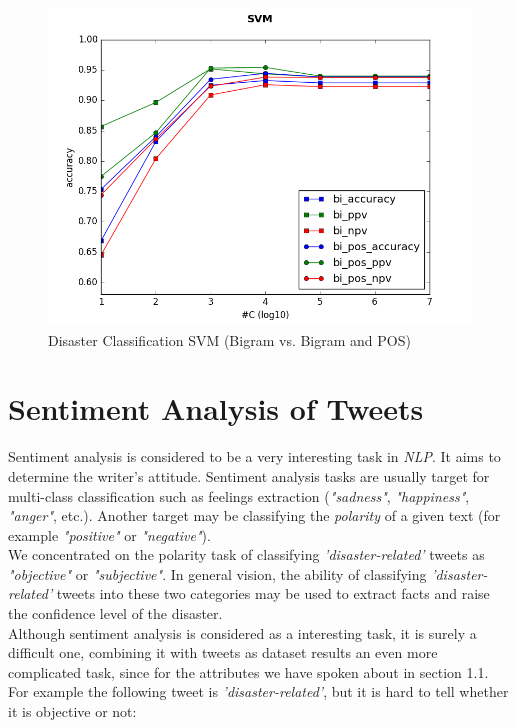 \documentclass[letterpaper,twocolumn,10pt]{article}
\begin{document}
\begin{figure}[H]
	\centering
	\includegraphics[width=\columnwidth]{../graphs/DisasterClassification/svm_bi_features.png}
	\caption{Disaster Classification SVM (Bigram vs. Bigram and POS)}
	\label{fig:disaster_classification_svm_bi}
\end{figure}

\section{Sentiment Analysis of Tweets}  \label{mission2}

Sentiment analysis is considered to be a very interesting task in \textit{NLP}. It aims to determine the writer's attitude. Sentiment analysis tasks are usually target for multi-class classification such as feelings extraction (\textit{"sadness"}, \textit{"happiness"}, \textit{"anger"}, etc.). Another target may be classifying the \textit{polarity} of a given text (for example \textit{"positive"} or \textit{"negative"}). \\
We concentrated on the polarity task of classifying \textit{'disaster-related'} tweets as \textit{"objective"} or \textit{"subjective"}. In general vision, the ability of classifying \textit{'disaster-related'} tweets into these two categories may be used to extract facts and raise the confidence level of the disaster. \\
Although sentiment analysis is considered as a interesting task, it is surely a difficult one, combining it with tweets as dataset results an even more complicated task, since for the attributes we have spoken about in section 1.1. For example the following tweet is \textit{'disaster-related'}, but it is hard to tell whether it is objective or not:
\begin{center}
	\parbox{190pt}{}
\end{center}
\end{document}
